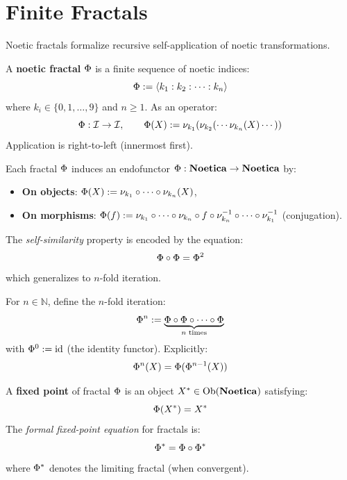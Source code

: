 \section{Finite Fractals}
\label{sec:finite-fractals}

Noetic fractals formalize recursive self-application of noetic transformations.

\begin{definition}
\label{def:noetic-fractal-core}
A \textbf{noetic fractal} $\Phi$ is a finite sequence of noetic indices:
\[
    \Phi := \langle k_1 : k_2 : \cdots : k_n \rangle
\]
where $k_i \in \{0, 1, \ldots, 9\}$ and $n \geq 1$. As an operator:
\[
    \Phi : \mathcal{I} \to \mathcal{I}, \qquad
    \Phi(X) := \nu_{k_1}(\nu_{k_2}(\cdots \nu_{k_n}(X) \cdots))
\]
Application is right-to-left (innermost first).
\end{definition}

\begin{definition}
\label{def:fractal-endofunctor}
Each fractal $\Phi$ induces an endofunctor $\Phi : \mathbf{Noetica} \to \mathbf{Noetica}$ by:
\begin{itemize}
    \item \textbf{On objects}: $\Phi(X) := \nu_{k_1} \circ \cdots \circ \nu_{k_n}(X)$,
    \item \textbf{On morphisms}: $\Phi(f) := \nu_{k_1} \circ \cdots \circ \nu_{k_n} \circ f
          \circ \nu_{k_n}^{-1} \circ \cdots \circ \nu_{k_1}^{-1}$ (conjugation).
\end{itemize}
The \emph{self-similarity} property is encoded by the equation:
\[
    \Phi \circ \Phi = \Phi^2
\]
which generalizes to $n$-fold iteration.
\end{definition}

\begin{definition}
\label{def:fractal-iteration}
For $n \in \mathbb{N}$, define the $n$-fold iteration:
\[
    \Phi^n := \underbrace{\Phi \circ \Phi \circ \cdots \circ \Phi}_{n \text{ times}}
\]
with $\Phi^0 := \mathrm{id}$ (the identity functor). Explicitly:
\[
    \Phi^n(X) = \Phi(\Phi^{n-1}(X))
\]
\end{definition}

\begin{definition}
\label{def:fractal-fixpoint-core}
A \textbf{fixed point} of fractal $\Phi$ is an object $X^* \in \mathrm{Ob}(\mathbf{Noetica})$
satisfying:
\[
    \Phi(X^*) = X^*
\]
The \emph{formal fixed-point equation} for fractals is:
\[
    \Phi^* = \Phi \circ \Phi^*
\]
where $\Phi^*$ denotes the limiting fractal (when convergent).
\end{definition}

